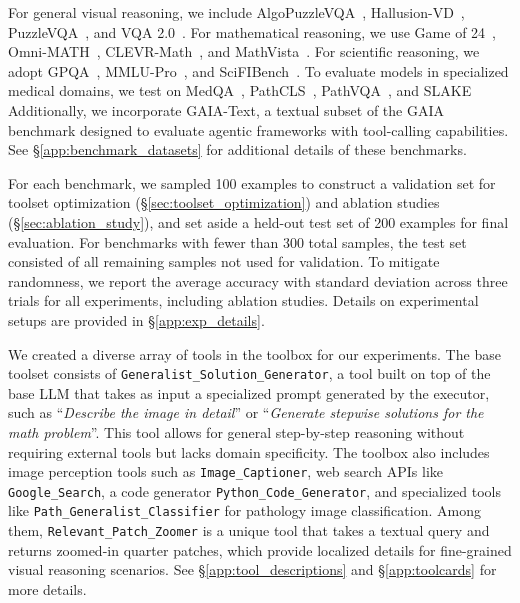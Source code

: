 For general visual reasoning, we include AlgoPuzzleVQA~\cite{ghosal2024language}, Hallusion-VD~\cite{guan2024hallusionbench}, PuzzleVQA~\cite{chia2024puzzlevqa}, and  VQA 2.0~\cite{goyal2017making}. For mathematical reasoning, we use Game of 24~\cite{24game}, Omni-MATH~\cite{gao2024omni}, CLEVR-Math~\cite{lindstrom2022clevr}, and MathVista~\cite{lu2024mathvista}. For scientific reasoning, we adopt GPQA~\cite{rein2023gpqa}, MMLU-Pro~\cite{wang2024mmlu}, and SciFIBench~\cite{roberts2024scifibench}. To evaluate models in specialized medical domains, we test on MedQA~\cite{jin2021disease}, PathCLS~\cite{sun2025pathmmu}, PathVQA~\cite{he2020pathvqa}, and SLAKE~\cite{liu2021slake} Additionally, we incorporate GAIA-Text, a textual subset of the GAIA~\cite{mialon2023gaia} benchmark designed to evaluate agentic frameworks with tool-calling capabilities. See \S\ref{app:benchmark_datasets} for additional details of these benchmarks.


For each benchmark, we sampled 100 examples to construct a validation set for toolset optimization (\S\ref{sec:toolset_optimization}) and ablation studies (\S\ref{sec:ablation_study}), and set aside a held-out test set of 200 examples for final evaluation. For benchmarks with fewer than 300 total samples, the test set consisted of all remaining samples not used for validation. To mitigate randomness, we report the average accuracy with standard deviation across three trials for all experiments, including ablation studies. Details on experimental setups are provided in \S\ref{app:exp_details}. 

We created a diverse array of tools in the toolbox for our experiments. The base toolset consists of \texttt{Generalist\_Solution\_Generator}, a tool built on top of the base LLM that takes as input a specialized prompt generated by the executor, such as ``\textit{Describe the image in detail}'' or ``\textit{Generate stepwise solutions for the math problem}''. This tool allows for general step-by-step reasoning without requiring external tools but lacks domain specificity. The toolbox also includes image perception tools such as \texttt{Image\_Captioner}, web search APIs like \texttt{Google\_Search}, a code generator \texttt{Python\_Code\_Generator}, and specialized tools like \texttt{Path\_Generalist\_Classifier} for pathology image classification. Among them, \texttt{Relevant\_Patch\_Zoomer} is a unique tool that takes a textual query and returns zoomed-in quarter patches, which provide localized details for fine-grained visual reasoning scenarios. See \S\ref{app:tool_descriptions} and \S\ref{app:toolcards} for more details.

